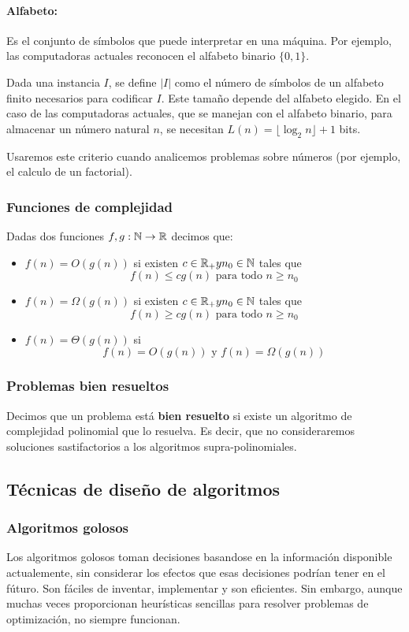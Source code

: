 \paragraph{Alfabeto:} Es el conjunto de símbolos que puede interpretar en una máquina. Por ejemplo, las computadoras actuales reconocen el alfabeto binario \(\{0,1\}\).

\vspace*{5mm}
Dada una instancia \(I\), se define \(|I|\) como el número de símbolos de un alfabeto finito necesarios para codificar \(I\). Este tamaño depende del alfabeto elegido.  En el caso de las computadoras actuales, que se manejan con el alfabeto binario, para almacenar un número natural \(n\), se necesitan \(L(n) = \lfloor\log_2{n}\rfloor + 1\) bits.

Usaremos este criterio cuando analicemos problemas sobre números (por ejemplo, el calculo de un factorial).

\subsubsection{Funciones de complejidad}
Dadas dos funciones \(f,g:\mathbb{N}\to\mathbb{R}\) decimos que:
\begin{itemize}
	\item \(f(n) = O(g(n))\) si existen \(c\in\mathbb{R}_+ y n_0\in\mathbb{N}\) tales que
	\[f(n)\leq cg(n) \text{ para todo } n\geq n_0\]
	\item \(f(n) = \Omega(g(n))\) si existen \(c\in\mathbb{R}_+ y n_0\in\mathbb{N}\) tales que
	\[f(n)\geq cg(n) \text{ para todo } n\geq n_0\]
	\item \(f(n) = \Theta(g(n))\) si \[f(n) = O(g(n)) \text{ y } f(n)= \Omega(g(n))\]
\end{itemize}

\subsubsection{Problemas bien resueltos}
Decimos que un problema está \textbf{bien resuelto} si existe un algoritmo de complejidad polinomial que lo resuelva. Es decir, que no consideraremos soluciones sastifactorios a los algoritmos supra-polinomiales.

\subsection{Técnicas de diseño de algoritmos}
\subsubsection{Algoritmos golosos}
Los algoritmos golosos toman decisiones basandose en la información disponible actualemente, sin considerar los efectos que esas decisiones podrían tener en el fúturo. Son fáciles de inventar, implementar y son eficientes. Sin embargo, aunque muchas veces proporcionan heurísticas sencillas para resolver problemas de optimización, no siempre funcionan.

